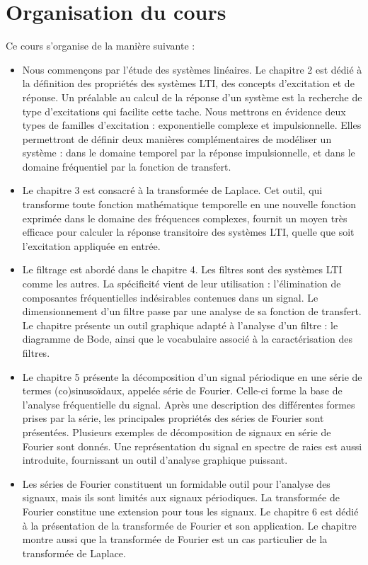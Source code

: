 	\section{Organisation du cours}
	Ce cours s'organise de la manière suivante :
	\begin{itemize}
		\item Nous commençons par l'étude des systèmes linéaires. Le chapitre 2 est dédié à la définition des propriétés des systèmes LTI, des concepts d'excitation et de réponse. Un préalable au calcul de la réponse d'un système est la recherche de type d'excitations qui facilite cette tache. Nous mettrons en évidence deux types de familles d'excitation : exponentielle complexe et impulsionnelle. Elles permettront de définir deux manières complémentaires de modéliser un système : dans le domaine temporel par la réponse impulsionnelle, et dans le domaine fréquentiel par la fonction de transfert.
		\item Le chapitre 3 est consacré à la transformée de Laplace. Cet outil, qui transforme toute fonction mathématique temporelle en une nouvelle fonction exprimée dans le domaine des fréquences complexes, fournit un moyen très efficace pour calculer la réponse transitoire des systèmes LTI, quelle que soit l'excitation appliquée en entrée.
		\item Le filtrage est abordé dans le chapitre 4. Les filtres sont des systèmes LTI comme les autres. La spécificité vient de leur utilisation : l'élimination de composantes fréquentielles indésirables contenues dans un signal. Le dimensionnement d'un filtre passe par une analyse de sa fonction de transfert. Le chapitre présente un outil graphique adapté à l'analyse d'un filtre : le diagramme de Bode, ainsi que le vocabulaire associé à la caractérisation des filtres.
		\item Le chapitre 5 présente la décomposition d'un signal périodique en une série de termes (co)sinusoïdaux, appelée série de Fourier. Celle-ci forme la base de l'analyse fréquentielle du signal. Après une description des différentes formes prises par la série, les principales propriétés des séries de Fourier sont présentées. Plusieurs exemples de décomposition de signaux en série de Fourier sont donnés. Une représentation du signal en spectre de raies est aussi introduite, fournissant un outil d'analyse graphique puissant.
		\item Les séries de Fourier constituent un formidable outil pour l'analyse des signaux, mais ils sont limités aux signaux périodiques. La transformée de Fourier constitue une extension pour tous les signaux. Le chapitre 6 est dédié à la présentation de la transformée de Fourier et son application. Le chapitre montre aussi que la transformée de Fourier est un cas particulier de la transformée de Laplace.

\end{itemize}
